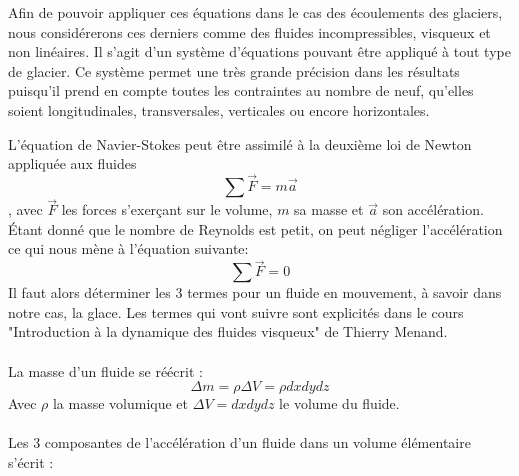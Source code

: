 \documentclass{article}
\begin{document}
Afin de pouvoir appliquer ces équations dans le cas des écoulements des glaciers, nous considérerons ces derniers comme des fluides incompressibles, visqueux et non linéaires. Il s'agit d'un système d'équations pouvant être appliqué à tout type de glacier.
\newpage
Ce système permet une très grande précision dans les résultats puisqu'il prend en compte toutes les contraintes au nombre de neuf, qu’elles soient longitudinales, transversales, verticales ou encore horizontales. 


L'équation de Navier-Stokes peut être assimilé à la deuxième loi de Newton appliquée aux fluides
\begin{equation}
\sum\vec{F}=m\vec{a}
\end{equation}
 , avec  $\vec{F}$ les forces s'exerçant sur le volume, $m$ sa masse et  $\vec{a}$  son accélération.
Étant donné que le nombre de Reynolds est petit, on peut négliger l'accélération ce qui nous mène à l'équation suivante:
\begin{equation}
\sum\vec{F}= 0
\end{equation}
Il faut alors déterminer les 3 termes pour un fluide en mouvement, à savoir dans notre cas, la glace. \newline
Les termes qui vont suivre sont explicités dans le cours "Introduction à la dynamique des fluides visqueux" de Thierry Menand.\cite{menand2020introduction}
\\\\
La masse d'un fluide se réécrit :
\begin{equation}
\Delta m = \rho \Delta V = \rho dxdydz
\end{equation}
Avec $\rho$ la masse volumique et $\Delta V =dxdydz $ le volume du fluide.
\\\\
Les 3 composantes de l'accélération d'un fluide dans un volume élémentaire s'écrit : 
\end{document}
